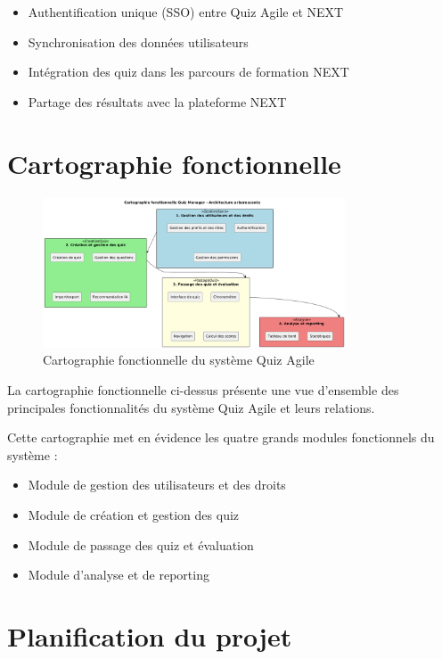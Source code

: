 \documentclass[12pt,a4paper]{report}
\begin{document}
\begin{itemize}
\item Authentification unique (SSO) entre Quiz Agile et NEXT
\item Synchronisation des données utilisateurs
\item Intégration des quiz dans les parcours de formation NEXT
\item Partage des résultats avec la plateforme NEXT
\end{itemize}

\section{Cartographie fonctionnelle}

\begin{figure}[H]
\centering
\includegraphics[width=0.8\textwidth]{latex_media/media/image11.png}
\caption{Cartographie fonctionnelle du système Quiz Agile}
\label{fig:cartographie-fonctionnelle}
\end{figure}

La cartographie fonctionnelle ci-dessus présente une vue d'ensemble des principales fonctionnalités du système Quiz Agile et leurs relations.

Cette cartographie met en évidence les quatre grands modules fonctionnels du système :
\begin{itemize}
\item Module de gestion des utilisateurs et des droits
\item Module de création et gestion des quiz
\item Module de passage des quiz et évaluation
\item Module d'analyse et de reporting
\end{itemize}

\section{Planification du projet}
\end{document}
